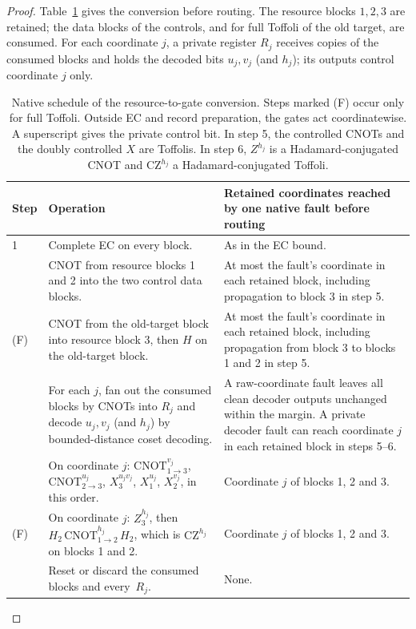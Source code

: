 \begin{proof}
Table~\ref{tab:toffoli} gives the conversion before routing.
The resource blocks \(1,2,3\) are retained; the data blocks of the
controls, and for full Toffoli of the old target, are consumed. For
each coordinate \(j\), a private register \(R_j\) receives copies of
the consumed blocks and holds the decoded bits \(u_j,v_j\) (and
\(h_j\)); its outputs control coordinate \(j\) only.

\begin{table}[!tb]
\caption{Native schedule of the resource-to-gate conversion. Steps
marked (F) occur only for full Toffoli. Outside EC and record preparation,
the gates act coordinatewise. A superscript gives the private control bit.
In step 5, the controlled CNOTs and the doubly controlled \(X\) are
Toffolis. In step 6, \(Z^{h_j}\) is a Hadamard-conjugated CNOT and
\(\mathrm{CZ}^{h_j}\) a Hadamard-conjugated Toffoli.}\label{tab:toffoli}
\small\centering
\begin{tabular}{@{}l>{\raggedright\arraybackslash}p{}>{\raggedright\arraybackslash}p{}@{}}
\toprule
Step & Operation & Retained coordinates reached by one native fault before routing\\
\midrule
1 & Complete EC on every block. & As in the EC bound.\\\addlinespace[3pt]
2 & CNOT from resource blocks 1 and 2 into the two control data blocks. & At most the fault's coordinate in each retained block, including propagation to block 3 in step 5.\\\addlinespace[3pt]
3 (F) & CNOT from the old-target block into resource block 3, then \(H\) on the old-target block. & At most the fault's coordinate in each retained block, including propagation from block 3 to blocks 1 and 2 in step 5.\\\addlinespace[3pt]
4 & For each \(j\), fan out the consumed blocks by CNOTs into \(R_j\) and decode \(u_j,v_j\) (and \(h_j\)) by bounded-distance coset decoding. & A raw-coordinate fault leaves all clean decoder outputs unchanged within the margin. A private decoder fault can reach coordinate \(j\) in each retained block in steps 5--6.\\\addlinespace[3pt]
5 & On coordinate \(j\): \(\mathrm{CNOT}^{v_j}_{1\to3}\), \(\mathrm{CNOT}^{u_j}_{2\to3}\), \(X_3^{u_jv_j}\), \(X_1^{u_j}\), \(X_2^{v_j}\), in this order. & Coordinate \(j\) of blocks 1, 2 and 3.\\\addlinespace[3pt]
6 (F) & On coordinate \(j\): \(Z_3^{h_j}\), then \(H_2\,\mathrm{CNOT}^{h_j}_{1\to2}\,H_2\), which is \(\mathrm{CZ}^{h_j}\) on blocks 1 and 2. & Coordinate \(j\) of blocks 1, 2 and 3.\\\addlinespace[3pt]
7 & Reset or discard the consumed blocks and every~\(R_j\). & None.\\
\bottomrule
\end{tabular}
\end{table}


\end{proof}
